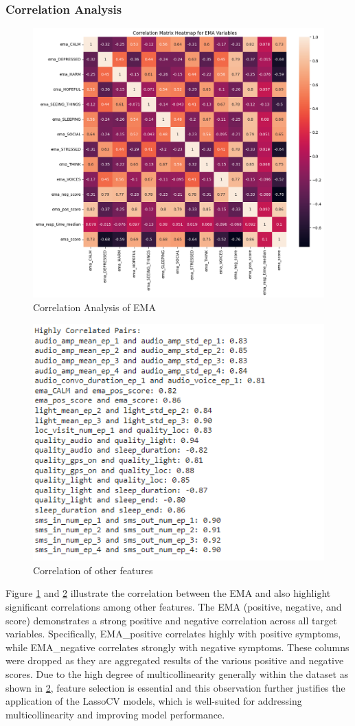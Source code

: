 \subsubsection{Correlation Analysis}
\begin{figure}[H]
    \centering
    \includegraphics[width=0.5\linewidth]{Dissertation 24/heatmap.png}
    \caption{Correlation Analysis of EMA}
    \label{cor}
\end{figure}
\begin{figure}[H]
    \centering
    \includegraphics[width=0.5\linewidth]{Dissertation 24/high_correlation.png}
    \caption{Correlation of other features}
    \label{corr}
\end{figure}

Figure \ref{cor} and \ref{corr} illustrate the correlation between the EMA and also highlight significant correlations among other features. The EMA (positive, negative, and score) demonstrates a strong positive and negative correlation across all target variables. Specifically, EMA\_positive correlates highly with positive symptoms, while EMA\_negative correlates strongly with negative symptoms. These columns were dropped as they are aggregated results of the various positive and negative scores.
Due to the high degree of multicollinearity generally within the dataset as shown in \ref{corr}, feature selection is essential and this observation further justifies the application of the LassoCV models, which is well-suited for addressing multicollinearity and improving model performance.
